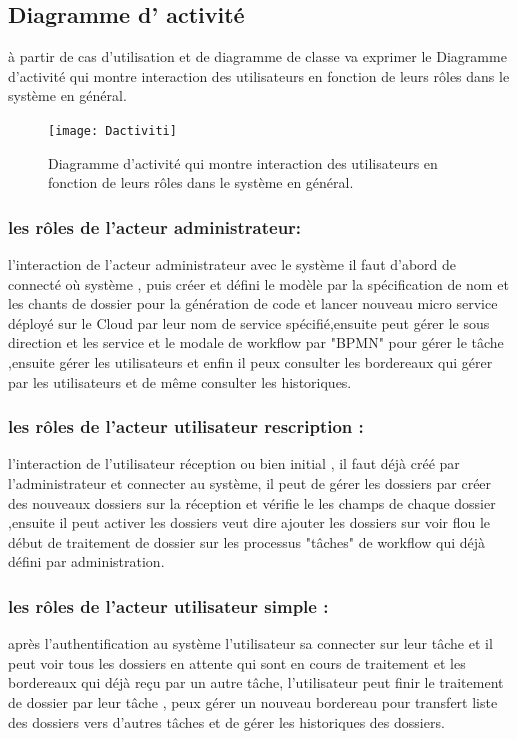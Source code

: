 \subsection{Diagramme d' activité  }

à partir de cas d'utilisation et de diagramme de classe  va exprimer  le Diagramme d'activité qui  montre interaction des  utilisateurs   en fonction de leurs rôles dans le système en général.
\begin{figure}[H]
	\centering
	\texttt{[image: Dactiviti]}
	\caption{Diagramme d'activité qui  montre interaction des  utilisateurs   en fonction de leurs rôles dans le système en général.}
	\label{fig:dactiviti}
\end{figure}
\subsubsection{les rôles de l'acteur administrateur: }
l'interaction de l'acteur administrateur avec le système il faut d'abord de connecté où système , puis créer  et  défini le modèle par la spécification de   nom et  les chants de dossier  pour la génération de code et lancer nouveau micro service déployé sur le Cloud par leur nom de service spécifié,ensuite peut gérer le sous direction et les service et le modale de workflow par "BPMN"  pour gérer le tâche   ,ensuite   gérer les utilisateurs  et enfin  il peux consulter les bordereaux qui gérer par les utilisateurs et de même  consulter les historiques.

\subsubsection{les rôles de l'acteur utilisateur rescription : }
l'interaction de l'utilisateur réception ou bien initial , il faut déjà créé par l'administrateur  et connecter au système, il peut de  gérer les dossiers par créer des nouveaux dossiers sur la réception et vérifie le   les champs  de chaque dossier ,ensuite il peut activer les dossiers veut dire ajouter les dossiers sur voir flou le début de traitement de dossier sur les processus "tâches" de workflow qui déjà défini par administration. 

\subsubsection{les rôles de l'acteur utilisateur simple : } 
 après l'authentification au système l'utilisateur sa connecter  sur leur tâche et il peut voir tous les dossiers en attente qui sont en cours de traitement et les bordereaux qui  déjà reçu par un autre tâche, l'utilisateur peut finir le traitement de dossier par leur tâche , peux gérer un nouveau bordereau pour transfert liste des dossiers vers d'autres tâches  et de gérer les historiques des dossiers.
   
